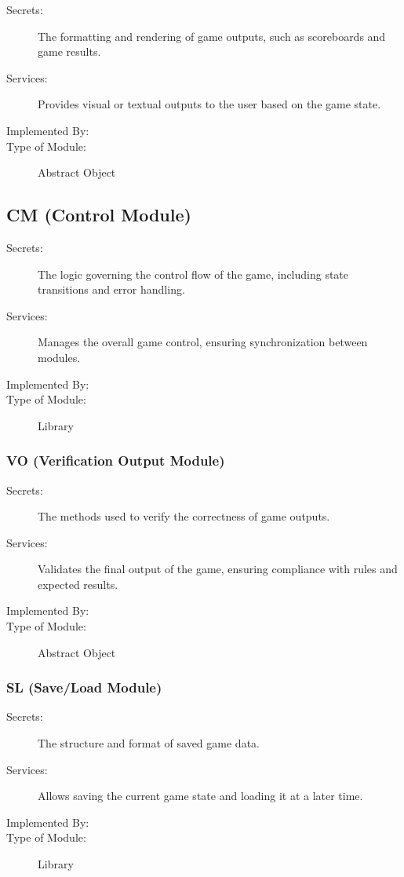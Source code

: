 \documentclass[12pt, titlepage]{article}
\begin{document}
\begin{description}
\item[Secrets:] The formatting and rendering of game outputs, such as scoreboards and game results.
\item[Services:] Provides visual or textual outputs to the user based on the game state.
\item[Implemented By:] \progname{}
\item[Type of Module:] Abstract Object
\end{description}

\subsection{CM (Control Module)}

\begin{description}
\item[Secrets:] The logic governing the control flow of the game, including state transitions and error handling.
\item[Services:] Manages the overall game control, ensuring synchronization between modules.
\item[Implemented By:] \progname{}
\item[Type of Module:] Library
\end{description}

\subsubsection{VO (Verification Output Module)}

\begin{description}
\item[Secrets:] The methods used to verify the correctness of game outputs.
\item[Services:] Validates the final output of the game, ensuring compliance with rules and expected results.
\item[Implemented By:] \progname{}
\item[Type of Module:] Abstract Object
\end{description}

\subsubsection{SL (Save/Load Module)}

\begin{description}
\item[Secrets:] The structure and format of saved game data.
\item[Services:] Allows saving the current game state and loading it at a later time.
\item[Implemented By:] \progname{}
\item[Type of Module:] Library
\end{description}
\end{document}
